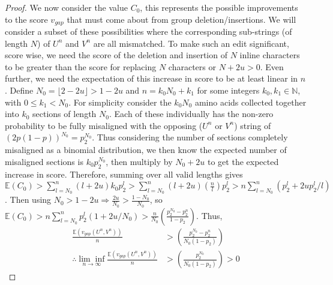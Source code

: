 \documentclass{article}
\begin{document}
\begin{proof}
We now consider the value $C_0$, this represents the possible improvements to the score $v_{gap}$ that must come about from group deletion/insertions. We will consider a subset of these possibilities where the corresponding sub-strings (of length $N$) of $U^n$ and $V^n$ are all mismatched. To make such an edit significant, score wise, we need the score of the deletion and insertion of $N$ inline characters to be greater than the score for replacing $N$ characters or $N+2u>0$. Even further, we need the expectation of this increase in score to be at least linear in $n$. Define $N_0 = \lfloor 2-2u \rfloor > 1-2u $ and $n=k_0N_0 + k_1$ for some integers $k_0, k_1 \in \mathbb{N}$, with $0 \leq k_1 < N_0$. For simplicity consider the $k_0N_0$ amino acids collected together into $k_0$ sections of length $N_0$. Each of these individually has the non-zero probability to be fully misaligned with the opposing ($U^n$ or $V^n$) string of $(2p(1-p))^{N_0}=p_2^{N_0}$. Thus considering the number of sections completely misaligned as a binomial distribution, we then know the expected number of misaligned sections is $k_0 p_2^{N_0}$, then multiply by $N_0+2u$ to get the expected increase in score. Therefore, summing over all valid lengths gives $\mathbb{E}(C_0) > \sum_{l=N_0}^n (l+2u)k_0p_2^{l} > \sum_{l=N_0}^n (l+2u)(\frac{n}{l})p_2^{l} > n \sum_{l=N_0}^n (p_2^{l}+2up_2^l / l)$. Then using $N_0>1-2u \Rightarrow \frac{2u}{N_0}>\frac{1-N_0}{N_0} $, so $\mathbb{E}(C_0) > n \sum_{l=N_0}^n p_2^{l}(1+2u/ N_0)>\frac{n}{N_0} \left( \frac{p_2^{N_0}-p_2^n}{1-p_2} \right).$ Thus,
\begin{equation*}
\begin{split}
\frac{\mathbb{E} (v_{gap}(U^n,V^n))}{n} &> \left( \frac{p_2^{N_0}-p_2^n}{N_0(1-p_2)} \right) \\ 
\therefore \underset{n \to \infty}{\lim \inf} \frac{\mathbb{E} (v_{gap}(U^n,V^n))}{n} &> \left( \frac{p_2^{N_0}}{N_0(1-p_2)} \right) >0
\end{split}
\end{equation*}
\end{proof}
\end{document}
